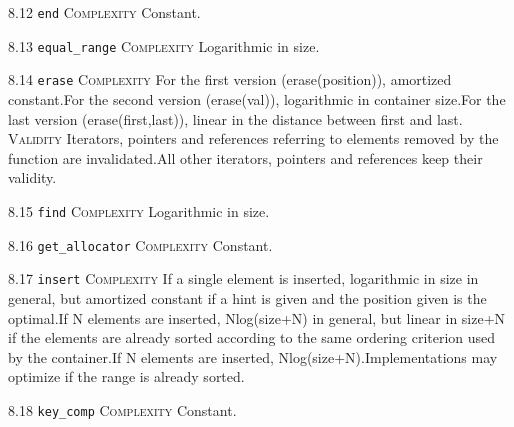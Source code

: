 \noindent\textcolor{cgreen}{8.12 \texttt{end}} \textsc{Complexity} Constant. \vspace{0.5em}

\noindent\textcolor{clime}{8.13 \texttt{equal\_range}} \textsc{Complexity} Logarithmic in size. \vspace{0.5em}

\noindent\textcolor{corange}{8.14 \texttt{erase}} \textsc{Complexity} For the first version (erase(position)), amortized constant.For the second version (erase(val)), logarithmic in container size.For the last version (erase(first,last)), linear in the distance between first and last. \textsc{Validity} Iterators, pointers and references referring to elements removed by the function are invalidated.All other iterators, pointers and references keep their validity.\vspace{0.5em}

\noindent\textcolor{clime}{8.15 \texttt{find}} \textsc{Complexity} Logarithmic in size. \vspace{0.5em}

\noindent\textcolor{cgreen}{8.16 \texttt{get\_allocator}} \textsc{Complexity} Constant. \vspace{0.5em}

\noindent\textcolor{corange}{8.17 \texttt{insert}} \textsc{Complexity} If a single element is inserted, logarithmic in size in general, but amortized constant if a hint is given and the position given is the optimal.If N elements are inserted, Nlog(size+N) in general, but linear in size+N if the elements are already sorted according to the same ordering criterion used by the container.If N elements are inserted, Nlog(size+N).Implementations may optimize if the range is already sorted. \vspace{0.5em}

\noindent\textcolor{cgreen}{8.18 \texttt{key\_comp}} \textsc{Complexity} Constant. \vspace{0.5em}


